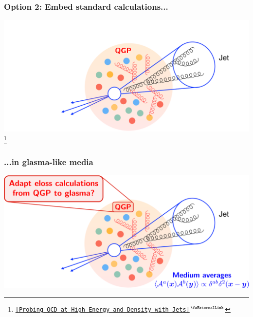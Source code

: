 \documentclass[aspectratio=169,11pt,usenames,dvipsnames]{beamer}
\renewcommand{\thefootnote}{\color{customblue}\faPaperPlaneO}
\newcommand\blfootnote[1]{%
  \begingroup
  \renewcommand\thefootnote{}\footnote{#1}%
  \addtocounter{footnote}{-1}%
  \endgroup
}
\begin{document}
\begin{frame}[noframenumbering]
    \frametitle{{\normalsize\color{jyured}\bfseries\sffamily Option 2: }Embed standard calculations...}
    \hspace{20pt}
        \includegraphics[width=0.8\paperwidth]{images/probingQCDqgp.png}
    \blfootnote{\scriptsize \href{https://www.int.washington.edu/programs-and-workshops/21r-2b}{{\color{blue}\texttt{[Probing QCD at High Energy and Density with Jets]$^\text{\scalebox{0.9}{\faExternalLink}}$}}}}
\end{frame}


\begin{frame}[noframenumbering]
    \frametitle{...in glasma-like media}
    \hspace{20pt}
        \includegraphics[width=0.8\paperwidth]{images/probingQCDglasma.png}
\end{frame}
\end{document}
